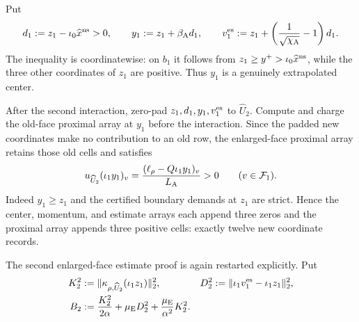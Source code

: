 Put
\begin{equation}
 d_1:=z_1-\iota_0\widehat x^{\rm ns}>0,
 \qquad
 y_1:=z_1+\beta_{\rm A}d_1,
 \qquad
 v_1^{\rm es}:=z_1+
   \left(\frac1{\sqrt{\chi_{\rm A}}}-1\right)d_1.
 \label{eq:branch-caterpillar-second-nonsettled-momentum}
\end{equation}
The inequality is coordinatewise: on $b_1$ it follows from
$z_1\geq y^+>\iota_0\widehat x^{\rm ns}$, while the three other coordinates
of $z_1$ are positive.  Thus $y_1$ is a genuinely extrapolated center.

After the second interaction, zero-pad $z_1,d_1,y_1,v_1^{\rm es}$ to
$\widehat U_2$.  Compute and charge the old-face proximal array at $y_1$
before the interaction.  Since the padded new coordinates make no
contribution to an old row, the enlarged-face proximal array retains those
old cells and satisfies
\begin{equation}
 u_{\widehat U_2}(\iota_1y_1)_v
 =\frac{(\ell_\rho-Q\iota_1y_1)_v}{L_{\rm A}}>0
 \qquad(v\in\mathcal F_1).
 \label{eq:branch-caterpillar-second-nonsettled-auxiliary-append}
\end{equation}
Indeed $y_1\geq z_1$ and the certified boundary demands at $z_1$ are
strict.  Hence the center, momentum, and estimate arrays each append three
zeros and the proximal array appends three positive cells: exactly twelve
new coordinate records.

The second enlarged-face estimate proof is again restarted explicitly.  Put
\begin{align}
 K_2^2
 &:=\lVert\kappa_{\rho,\widehat U_2}(\iota_1z_1)\rVert_2^2,
 &D_2^2
 &:=\lVert\iota_1v_1^{\rm es}-\iota_1z_1\rVert_2^2,
 \notag\\
 B_2
 &:=\frac{K_2^2}{2\alpha}
   +\mu_{\rm E}D_2^2
   +\frac{\mu_{\rm E}}{\alpha^2}K_2^2.
 \label{eq:branch-caterpillar-second-nonsettled-shock-budget}
\end{align}

